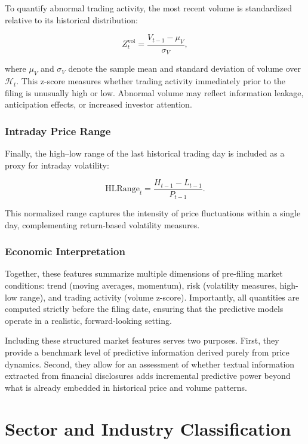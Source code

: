 To quantify abnormal trading activity, the most recent volume is standardized relative to its historical distribution:

\begin{equation}
Z^{\text{vol}}_t =
\frac{V_{t-1} - \mu_V}{\sigma_V},
\end{equation}

where $\mu_V$ and $\sigma_V$ denote the sample mean and standard deviation of volume over $\mathcal{H}_t$. This z-score measures whether trading activity immediately prior to the filing is unusually high or low. Abnormal volume may reflect information leakage, anticipation effects, or increased investor attention.

\subsubsection*{Intraday Price Range}

Finally, the high–low range of the last historical trading day is included as a proxy for intraday volatility:

\begin{equation}
\text{HLRange}_t =
\frac{H_{t-1} - L_{t-1}}{P_{t-1}}.
\end{equation}

This normalized range captures the intensity of price fluctuations within a single day, complementing return-based volatility measures.

\subsubsection*{Economic Interpretation}

Together, these features summarize multiple dimensions of pre-filing market conditions: trend (moving averages, momentum), risk (volatility measures, high-low range), and trading activity (volume z-score). Importantly, all quantities are computed strictly before the filing date, ensuring that the predictive models operate in a realistic, forward-looking setting.

Including these structured market features serves two purposes. First, they provide a benchmark level of predictive information derived purely from price dynamics. Second, they allow for an assessment of whether textual information extracted from financial disclosures adds incremental predictive power beyond what is already embedded in historical price and volume patterns.

\section{Sector and Industry Classification}

